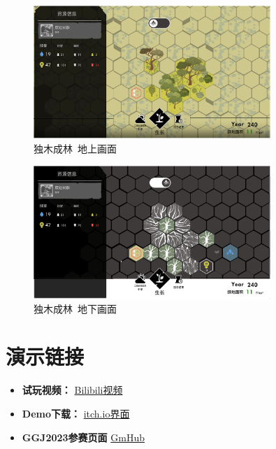 \begin{figure}[H]
    \centering
    \includegraphics[width=0.8\textwidth]{Images/独木成林/dmzl1.png}
    \caption{独木成林\ 地上画面}
\end{figure}

\begin{figure}[H]
    \centering
    \includegraphics[width=0.8\textwidth]{Images/独木成林/dmzl2.png}
    \caption{独木成林\ 地下画面}
\end{figure}

\section{演示链接}
\begin{itemize}
    \item \textbf{试玩视频：}  \href{https://www.bilibili.com/video/BV18A41167H6/?vd_source=ead0ac501dfae814e19fd7d9f376d92d}{Bilibili视频}
    \item \textbf{Demo下载：}  \href{https://scyq.itch.io/oasis}{itch.io界面} 
    \item \textbf{GGJ2023参赛页面} \href{https://www.gmhub.com/game/2379}{GmHub}
\end{itemize}